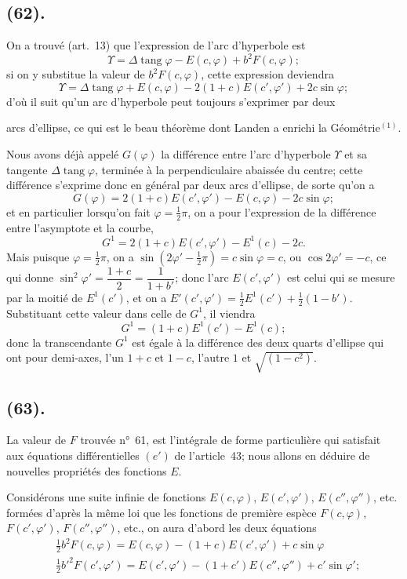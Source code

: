 \documentclass{article}
\begin{document}
\subsection*{(62).}

On a trouvé (art.~13) que l'expression de l'arc d'hyperbole est
\[ \Upsilon=\Delta\operatorname{tang}\varphi-E(c,\varphi)+b^{2}F(c,\varphi); \]
si on y substitue la valeur de $b^{2}F(c,\varphi)$, cette expression deviendra
\[ \Upsilon=\Delta\operatorname{tang}\varphi+E(c,\varphi)-2(1+c)E(c',\varphi')+2c\sin\varphi; \]
d'où il suit qu'un arc d'hyperbole peut toujours s'exprimer par deux

arcs d'ellipse, ce qui est le beau théorème dont Landen a enrichi la Géométrie${}^{(1)}$.

Nous avons déjà appelé $G(\varphi)$ la différence entre l'arc d'hyperbole $\Upsilon$ et sa tangente $\Delta\operatorname{tang}\varphi$, terminée à la perpendiculaire abaissée du centre; cette différence s'exprime donc en général par deux arcs d'ellipse, de sorte qu'on a
\[ G(\varphi)=2(1+c)E(c',\varphi')-E(c,\varphi)-2c\sin\varphi; \]
et en particulier lorsqu'on fait $\varphi=\frac{1}{2}\pi$, on a pour l'expression de la différence entre l'asymptote et la courbe,
\[ G^{1}=2(1+c)E(c',\varphi')-E^{1}(c)-2c. \]
Mais puisque $\varphi=\frac{1}{2}\pi$, on a $\sin(2\varphi'-\frac{1}{2}\pi)=c\sin\varphi=c$, ou $\cos2\varphi'=-c$, ce qui donne $\sin^{2}\varphi'=\dfrac{1+c}{2}=\dfrac{1}{1+b'}$; donc l'arc $E(c',\varphi')$ est celui qui se mesure par la moitié de $E^{1}(c')$, et on a $E'(c',\varphi')$${}=\frac{1}{2}E^{1}(c')+\frac{1}{2}(1-b')$. Substituant cette valeur dans celle de $G^{1}$, il viendra
\[ G^{1}=(1+c)E^{1}(c')-E^{1}(c); \]
donc la transcendante $G^{1}$ est égale à la différence des deux quarts d'ellipse qui ont pour demi-axes, l'un $1+c$ et $1-c$, l'autre $1$ et $\sqrt{(1-c^{2})}$.

\subsection*{(63).}

La valeur de $F$ trouvée n°~61, est l'intégrale de forme particulière qui satisfait aux équations différentielles $(e')$ de l'article~43; nous allons en déduire de nouvelles propriétés des fonctions $E$.

Considérons une suite infinie de fonctions $E(c,\varphi)$, $E(c',\varphi')$, $E(c'',\varphi'')$, etc. formées d'après la même loi que les fonctions de première espèce $F(c,\varphi)$, $F(c',\varphi')$, $F(c'',\varphi'')$, etc., on aura d'abord les deux équations
\[ \begin{aligned} &\tfrac{1}{2}b^{2}F(c,\varphi)=E(c,\varphi)-(1+c)E(c',\varphi')+c\sin\varphi\\ &\tfrac{1}{2}b'^{2}F(c',\varphi')=E(c',\varphi')-(1+c')E(c'',\varphi'')+c'\sin\varphi'; \end{aligned} \]
\end{document}
